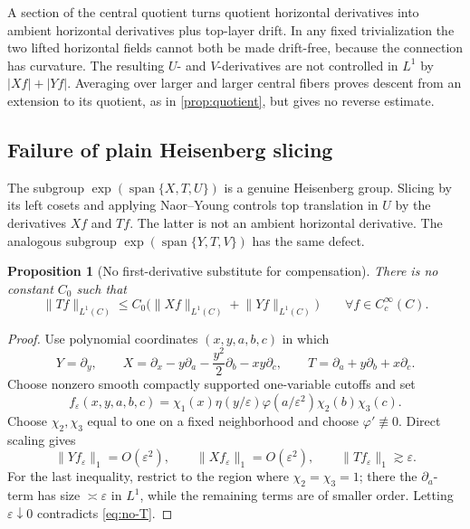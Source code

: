 \documentclass[11pt]{article}
\newtheorem{proposition}[theorem]{Proposition}
\theoremstyle{definition}
\theoremstyle{remark}
\newcommand{\abs}[1]{\lvert #1\rvert}
\newcommand{\norm}[1]{\lVert #1\rVert}
\newcommand{\eps}{\varepsilon}
\DeclareMathOperator{\spanop}{span}
\begin{document}
A section of the central quotient turns quotient horizontal derivatives into ambient
horizontal derivatives plus top-layer drift.  In any fixed trivialization the two lifted
horizontal fields cannot both be made drift-free, because the connection has curvature.
The resulting \(U\)- and \(V\)-derivatives are not controlled in \(L^1\) by
\(\abs{Xf}+\abs{Yf}\).  Averaging over larger and larger central fibers proves descent
from an extension to its quotient, as in \cref{prop:quotient}, but gives no reverse
estimate.

\subsection{Failure of plain Heisenberg slicing}

The subgroup \(\exp(\spanop\{X,T,U\})\) is a genuine Heisenberg group.  Slicing by its
left cosets and applying Naor--Young controls top translation in \(U\) by the derivatives
\(Xf\) and \(Tf\).  The latter is not an ambient horizontal derivative.  The analogous
subgroup \(\exp(\spanop\{Y,T,V\})\) has the same defect.

\begin{proposition}[No first-derivative substitute for compensation]\label{prop:no-T}
There is no constant \(C_0\) such that
\begin{equation}\label{eq:no-T}
 \norm{Tf}_{L^1(C)}\le C_0\bigl(\norm{Xf}_{L^1(C)}+\norm{Yf}_{L^1(C)}\bigr)
 \qquad\forall f\in C_c^\infty(C).
\end{equation}
\end{proposition}

\begin{proof}
Use polynomial coordinates \((x,y,a,b,c)\) in which
\[
 Y=\partial_y,\qquad
 X=\partial_x-y\partial_a-\frac{y^2}{2}\partial_b-xy\partial_c,
 \qquad
 T=\partial_a+y\partial_b+x\partial_c.
\]
Choose nonzero smooth compactly supported one-variable cutoffs and set
\[
 f_\eps(x,y,a,b,c)=
 \chi_1(x)\eta(y/\eps)\varphi(a/\eps^2)\chi_2(b)\chi_3(c).
\]
Choose \(\chi_2,\chi_3\) equal to one on a fixed neighborhood and choose
\(\varphi'\not\equiv0\).  Direct scaling gives
\[
 \norm{Yf_\eps}_1=O(\eps^2),\qquad
 \norm{Xf_\eps}_1=O(\eps^2),\qquad
 \norm{Tf_\eps}_1\gtrsim\eps.
\]
For the last inequality, restrict to the region where \(\chi_2=\chi_3=1\); there the
\(\partial_a\)-term has size \(\asymp\eps\) in \(L^1\), while the remaining terms are of
smaller order.  Letting \(\eps\downarrow0\) contradicts \eqref{eq:no-T}.
\end{proof}
\end{document}

